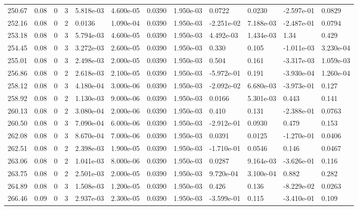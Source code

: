 \documentclass[preview]{standalone}
\begin{document}
{{{{{{{{{\begin{tabular}{L{1.2cm}C{1.2cm} C{0.3cm}C{0.5cm} C{1.4cm}C{1.4cm} C{1.4cm}C{1.4cm} C{1.6cm}C{1.6cm} C{1.6cm}C{1.6cm}}
  250.67  &  0.08  & 0     &  3 &  5.818e-03  & 4.600e-05  &  0.0390&   1.950e-03& 0.0722 & 0.0230   &  -2.597e-01 & 0.0829  \\ 
  252.16  &  0.08  & 0     &  2 &  0.0136  & 1.090e-04  &  0.0390&   1.950e-03& -2.251e-02 & 7.188e-03   &  -2.487e-01 & 0.0794  \\ 
  253.18  &  0.08  & 0     &  3 &  5.794e-03  & 4.600e-05  &  0.0390&   1.950e-03& 4.492e-03 & 1.434e-03   &  1.34 & 0.429  \\ 
  254.45  &  0.08  & 0     &  3 &  3.272e-03  & 2.600e-05  &  0.0390&   1.950e-03& 0.330 & 0.105   &  -1.011e-03 & 3.230e-04  \\ 
  255.01  &  0.08  & 0     &  3 &  2.498e-03  & 2.000e-05  &  0.0390&   1.950e-03& 0.504 & 0.161   &  -3.317e-03 & 1.059e-03  \\ 
  256.86  &  0.08  & 0     &  2 &  2.618e-03  & 2.100e-05  &  0.0390&   1.950e-03& -5.972e-01 & 0.191   &  -3.930e-04 & 1.260e-04  \\ 
  258.12  &  0.08  & 0     &  3 &  4.180e-04  & 3.000e-06  &  0.0390&   1.950e-03& -2.092e-02 & 6.680e-03   &  -3.973e-01 & 0.127  \\ 
  258.92  &  0.08  & 0     &  2 &  1.130e-03  & 9.000e-06  &  0.0390&   1.950e-03& 0.0166 & 5.301e-03   &  0.443 & 0.141  \\ 
  260.13  &  0.08  & 0     &  2 &  3.080e-04  & 2.000e-06  &  0.0390&   1.950e-03& 0.410 & 0.131   &  -2.388e-01 & 0.0763  \\ 
  260.50  &  0.08  & 0     &  3 &  7.090e-04  & 6.000e-06  &  0.0390&   1.950e-03& -2.912e-01 & 0.0930   &  0.479 & 0.153  \\ 
  262.08  &  0.08  & 0     &  3 &  8.670e-04  & 7.000e-06  &  0.0390&   1.950e-03& 0.0391 & 0.0125   &  -1.270e-01 & 0.0406  \\ 
  262.51  &  0.08  & 0     &  2 &  2.398e-03  & 1.900e-05  &  0.0390&   1.950e-03& -1.710e-01 & 0.0546   &  0.146 & 0.0467  \\ 
  263.06  &  0.08  & 0     &  2 &  1.041e-03  & 8.000e-06  &  0.0390&   1.950e-03& 0.0287 & 9.164e-03   &  -3.626e-01 & 0.116  \\ 
  263.75  &  0.08  & 0     &  2 &  2.501e-03  & 2.000e-05  &  0.0390&   1.950e-03& 9.720e-04 & 3.100e-04   &  0.882 & 0.282  \\ 
  264.89  &  0.08  & 0     &  3 &  1.508e-03  & 1.200e-05  &  0.0390&   1.950e-03& 0.426 & 0.136   &  -8.229e-02 & 0.0263  \\ 
  266.46  &  0.09  & 0     &  3 &  2.937e-03  & 2.300e-05  &  0.0390&   1.950e-03& -3.599e-01 & 0.115   &  -3.410e-01 & 0.109  \\ 

\end{tabular}}}}}}}}}}
\end{document}
